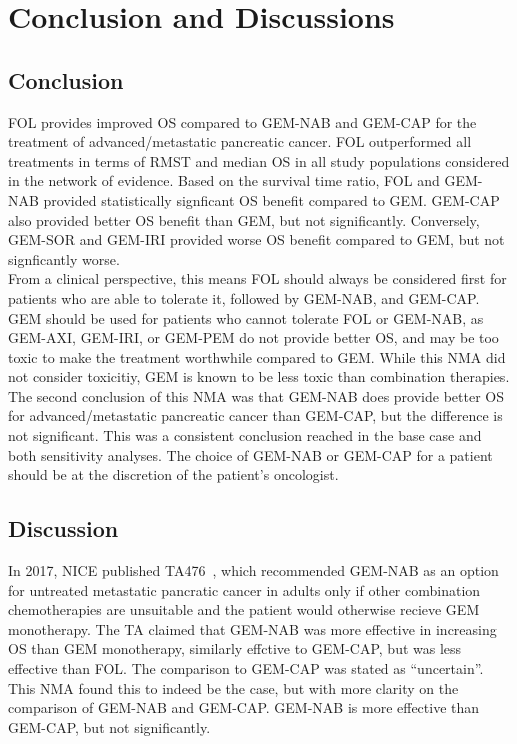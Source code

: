 \chapter{Conclusion and Discussions}\label{conclusions}

\section{Conclusion}
FOL provides improved OS compared to GEM-NAB and GEM-CAP for the treatment of advanced/metastatic pancreatic cancer. FOL outperformed all treatments in terms of RMST and median OS in all study populations considered in the network of evidence. Based on the survival time ratio, FOL and GEM-NAB provided statistically signficant OS benefit compared to GEM. GEM-CAP also provided better OS benefit than GEM, but not significantly. Conversely, GEM-SOR and GEM-IRI provided worse OS benefit compared to GEM, but not signficantly worse. \\

From a clinical perspective, this means FOL should always be considered first for patients who are able to tolerate it, followed by GEM-NAB, and GEM-CAP. GEM should be used for patients who cannot tolerate FOL or GEM-NAB, as GEM-AXI, GEM-IRI, or GEM-PEM do not provide better OS, and may be too toxic to make the treatment worthwhile compared to GEM. While this NMA did not consider toxicitiy, GEM is known to be less toxic than combination therapies. \\

The second conclusion of this NMA was that GEM-NAB does provide better OS for advanced/metastatic pancreatic cancer than GEM-CAP, but the difference is not significant. This was a consistent conclusion reached in the base case and both sensitivity analyses. The choice of GEM-NAB or GEM-CAP for a patient should be at the discretion of the patient's oncologist.

\section{Discussion}
In 2017, NICE published TA476~\cite{TA476}, which recommended GEM-NAB as an option for untreated metastatic pancratic cancer in adults only if other combination chemotherapies are unsuitable and the patient would otherwise recieve GEM monotherapy. The TA claimed that GEM-NAB was more effective in increasing OS than GEM monotherapy, similarly effctive to GEM-CAP, but was less effective than FOL. The comparison to GEM-CAP was stated as ``uncertain''. This NMA found this to indeed be the case, but with more clarity on the comparison of GEM-NAB and GEM-CAP. GEM-NAB is more effective than GEM-CAP, but not significantly. \\ 

